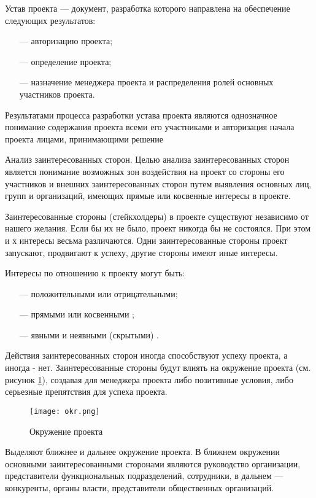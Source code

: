 Устав проекта --- документ, разработка которого направлена на обеспечение следующих результатов:
\begin{itemize}
	\item [---]авторизацию проекта;
\item [---]определение проекта;
\item [---]назначение менеджера проекта и распределения ролей основных участников проекта.
\end{itemize}

Результатами процесса разработки устава проекта являются однознач­ное понимание содержания проекта всеми его участниками и автори­зация начала проекта лицами, принимающими решение \cite[135--137]{polkovnikov}

Анализ заинтересованных сторон.
Целью анализа заинтересованных сторон является понимание возмож­ных зон воздействия на проект со стороны его участников и внешних заинтересованных сторон путем выявления основных лиц, групп и организаций, имеющих прямые или косвенные интересы в проекте.

Заинтересованные стороны (стейкхолдеры) в проекте существуют независимо от нашего желания.
Если бы их не было, проект никогда бы не состоялся.
При этом и х интересы весьма различаются.
Одни заинтересованные стороны проект запускают, продвигают к успеху, другие стороны имеют иные интересы.

Интересы по отношению к проекту могут быть:
\begin{itemize}
	\item [---]положительными или отрицательными;
	\item [---]прямыми или косвенными ;
	\item [---]явными и неявными (скрытыми) .
\end{itemize}

Действия заинтересованных сторон иногда способствуют успеху проекта, а иногда - нет.
Заинтересованные стороны будут влиять на окружение проекта (см. рисунок \ref{fig:okuzhenie}), создавая для менеджера проекта либо позитивные условия, либо серьезные препятствия для успеха проекта.

\begin{figure}[h]
	\centering
	\texttt{[image: okr.png]}
	\caption{Окружение проекта}
	\label{fig:okuzhenie}
\end{figure}

Выделяют ближнее и дальнее окружение проекта.
В ближнем окружении основными заинтересованными сторонами являются руко­водство организации, представители функциональных подразделений,
сотрудники, в дальнем --- конкуренты, органы власти, представители общественных организаций.


